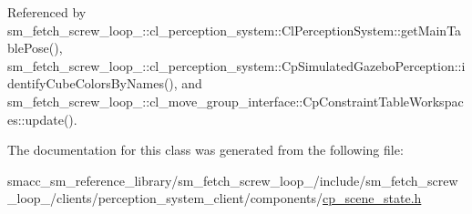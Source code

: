 Referenced by sm\+\_\+fetch\+\_\+screw\+\_\+loop\+\_\+::cl\+\_\+perception\+\_\+system\+::\+Cl\+Perception\+System\+::get\+Main\+Table\+Pose(), sm\+\_\+fetch\+\_\+screw\+\_\+loop\+\_\+::cl\+\_\+perception\+\_\+system\+::\+Cp\+Simulated\+Gazebo\+Perception\+::identify\+Cube\+Colors\+By\+Names(), and sm\+\_\+fetch\+\_\+screw\+\_\+loop\+\_\+::cl\+\_\+move\+\_\+group\+\_\+interface\+::\+Cp\+Constraint\+Table\+Workspaces\+::update().



The documentation for this class was generated from the following file\+:\begin{DoxyCompactItemize}
\item 
smacc\+\_\+sm\+\_\+reference\+\_\+library/sm\+\_\+fetch\+\_\+screw\+\_\+loop\+\_/include/sm\+\_\+fetch\+\_\+screw\+\_\+loop\+\_/clients/perception\+\_\+system\+\_\+client/components/\hyperlink{sm__fetch__screw__loop__1_2include_2sm__fetch__screw__loop__1_2clients_2perception__system__clieee3458176781c2fc203d99687f5e5b43}{cp\+\_\+scene\+\_\+state.\+h}\end{DoxyCompactItemize}
